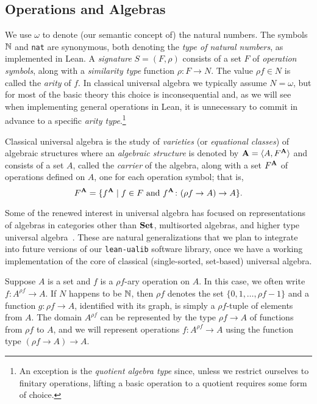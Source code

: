 \documentclass[11pt]{amsart}  %
\begin{document}
\subsection{Operations and Algebras}
We use $\omega$ to denote (our semantic concept of) the natural numbers.
The symbols $\mathbb{N}$ and {\tt nat} are synonymous, both denoting the \emph{type of natural numbers}, as implemented in Lean. A \emph{signature} $S = (F, \rho)$ consists of a set $F$ of \emph{operation symbols}, along with a \emph{similarity type} function $\rho \colon F \to N$. The value $\rho f \in N$  is called the \emph{arity} of $f$. In classical universal algebra we typically assume $N = \omega$, but for most of the basic theory this choice is inconsequential and, as we will see when implementing general operations in Lean, it is unnecessary to commit in advance to a specific \emph{arity type}.\footnote{An exception is the \emph{quotient algebra type} since, unless we restrict ourselves to finitary operations, lifting a basic operation to a quotient requires some form of choice.}

Classical universal algebra is the study of \emph{varieties} (or \emph{equational classes}) 
of algebraic structures where an \emph{algebraic structure} is denoted by $\mathbf{A} = \langle A, F^{\mathbf{A}}\rangle$ and consists of a set $A$, called the \emph{carrier} of the algebra, along with a set $F^{\mathbf{A}}$ of operations defined on $A$, one for each operation symbol; that is,
\[F^{\mathbf{A}} = \{f^{\mathbf{A}} \mid f\in F \text{ and } f^{\mathbf{A}} \colon (\rho f \to A) \to A\}.\] 

Some of the renewed interest in universal algebra has focused on representations of algebras in categories other than $\mathbf{Set}$, multisorted algebras, and higher type universal algebra~\cite{MR2757312,MR3003214,finster:2018,gepner:2018,MR1173632}.  These are natural generalizations that we plan to integrate into future versions of our \lstinline{lean-ualib} software library, once we have a working implementation of the core of classical (single-sorted, set-based) universal algebra.

Suppose $A$ is a set and $f$ is a $\rho f$-ary operation on $A$. In this case, we often write $f \colon A^{\rho f} \to A$.  If $N$ happens to be $\mathbb{N}$, then $\rho f$ denotes the set $\{0, 1, \dots, \rho f -1\}$ and a function $g \colon \rho f \to A$, identified with its graph, is simply a $\rho f$-tuple of elements from $A$.
The domain $A^{\rho f}$ can be represented by the type $\rho f \to A$ of functions from $\rho f$ to $A$, and we will represent operations $f \colon A^{\rho f} \to A$ using the function type $(\rho f \to A) \to A$. 
\end{document}
